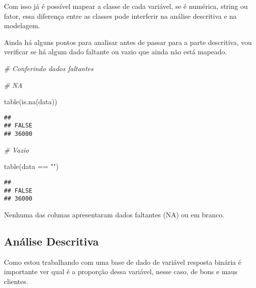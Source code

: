 \documentclass[
]{book}
\newenvironment{Shaded}{\begin{snugshade}}{\end{snugshade}}
\newcommand{\CommentTok}[1]{\textcolor[rgb]{0.56,0.35,0.01}{\textit{#1}}}
\newcommand{\FunctionTok}[1]{\textcolor[rgb]{0.00,0.00,0.00}{#1}}
\newcommand{\NormalTok}[1]{#1}
\newcommand{\SpecialCharTok}[1]{\textcolor[rgb]{0.00,0.00,0.00}{#1}}
\newcommand{\StringTok}[1]{\textcolor[rgb]{0.31,0.60,0.02}{#1}}
\begin{document}
Com isso já é possível mapear a classe de cada variável, se é numérica, string ou fator, essa diferença entre as classes pode interferir na análise descritiva e na modelagem.

Ainda há alguns pontos para analisar antes de passar para a parte descritiva, vou verificar se há algum dado faltante ou vazio que ainda não está mapeado.

\begin{Shaded}
\begin{Highlighting}[]
\CommentTok{\# Conferindo dados faltantes}

\CommentTok{\# NA}

\FunctionTok{table}\NormalTok{(}\FunctionTok{is.na}\NormalTok{(data))}
\end{Highlighting}
\end{Shaded}

\begin{verbatim}
## 
## FALSE 
## 36000
\end{verbatim}

\begin{Shaded}
\begin{Highlighting}[]
\CommentTok{\# Vazio}

\FunctionTok{table}\NormalTok{(data }\SpecialCharTok{==} \StringTok{""}\NormalTok{)}
\end{Highlighting}
\end{Shaded}

\begin{verbatim}
## 
## FALSE 
## 36000
\end{verbatim}

Nenhuma das colunas apresentaram dados faltantes (NA) ou em branco.

\hypertarget{anuxe1lise-descritiva-1}{%
\subsection{Análise Descritiva}\label{anuxe1lise-descritiva-1}}

Como estou trabalhando com uma base de dado de variável resposta binária é importante ver qual é a proporção dessa variável, nesse caso, de bons e maus clientes.

\begin{Shaded}
\end{Shaded}
\end{document}
